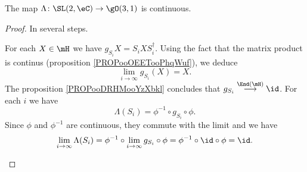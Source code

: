 \begin{lemma}       \label{LEMooTLQKooGntuRH}
	The map \( \Lambda\colon \SL(2,\eC)\to \gO(3,1)\) is continuous.
\end{lemma}

\begin{proof}
	In several steps.
	\begin{subproof}
		For each \( X\in \mH\) we have \( g_{S_i}X=S_iXS_i^{\dag}\). Using the fact that the matrix product is continus (proposition \ref{PROPooOEETooPhqWuf}), we deduce
		\begin{equation}
			\lim_{i\to \infty} g_{S_i}(X)=X.
		\end{equation}
		The proposition \ref{PROPooDRHMooYzXbkl} concludes that \( g_{S_i}\stackrel{\End(\mH)}{\longrightarrow}\id\).
		For each \( i\) we have
		\begin{equation}
			\Lambda(S_i)=\phi^{-1}\circ g_{S_i}\circ \phi.
		\end{equation}
		Since \( \phi\) and \( \phi^{-1}\) are continuous, they commute with the limit and we have
		\begin{equation}
			\lim_{i\to \infty} \Lambda(S_i)=\phi^{-1}\circ\lim_{i\to \infty} g_{S_i}\circ\phi=\phi^{-1}\circ\id\circ \phi=\id.
		\end{equation}


\end{subproof}
\end{proof}

